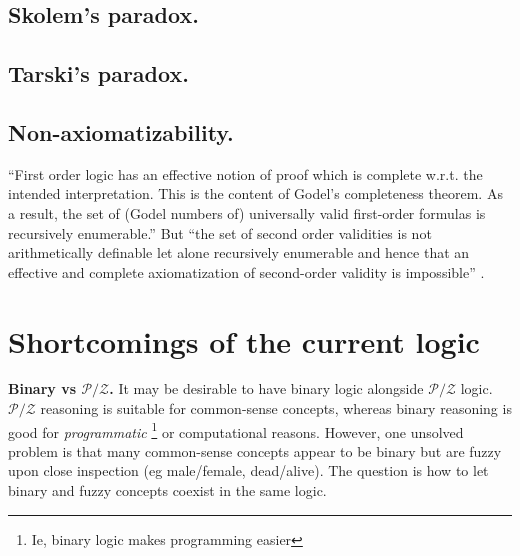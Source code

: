 \subsection{Skolem's paradox.}

\subsection{Tarski's paradox.}

\subsection{Non-axiomatizability.}

``First order logic has an effective notion of proof which is complete w.r.t. the intended interpretation.  This is the content of Godel's completeness theorem.  As a result, the set of (Godel numbers of) universally valid first-order formulas is recursively enumerable.''  But ``the set of second order validities is not arithmetically definable let alone recursively enumerable and hence that an effective and complete axiomatization of second-order validity is impossible'' \citep*{Benthem}.

\section{Shortcomings of the current logic}

\textbf{Binary vs $\mathcal{P/Z}$.}  It may be desirable to have binary logic alongside $\mathcal{P/Z}$ logic.  $\mathcal{P/Z}$ reasoning is suitable for common-sense concepts, whereas binary reasoning is good for \textit{programmatic}
\footnote{Ie, binary logic makes programming easier}
or computational reasons.  However, one unsolved problem is that many common-sense concepts appear to be binary but are fuzzy upon close inspection (eg male/female, dead/alive).  The question is how to let binary and fuzzy concepts coexist in the same logic.




